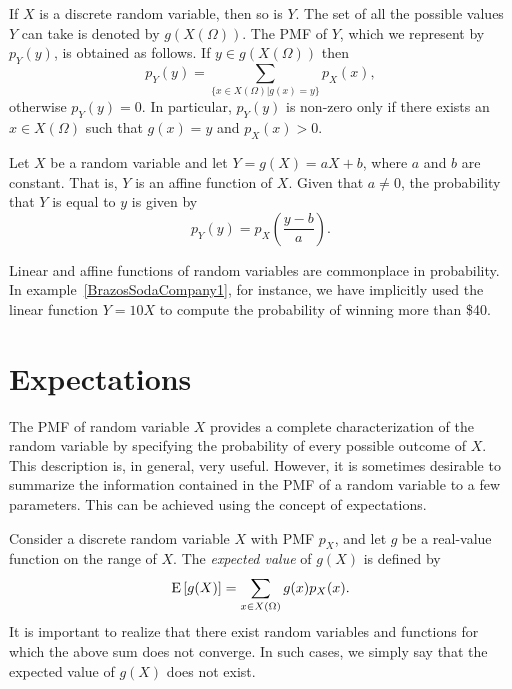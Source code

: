 If $X$ is a discrete random variable, then so is $Y$.
The set of all the possible values $Y$ can take is denoted by $g(X(\Omega))$.
The PMF of $Y$, which we represent by $p_Y (y)$, is obtained as follows.
If $y \in g(X(\Omega))$ then
\begin{equation} \label{equation:DefinitionFunctionPMF}
p_Y (y) = \sum_{ \{x \in X(\Omega) | g(x) = y \} } p_X (x) ,
\end{equation}
otherwise $p_Y (y) = 0$.
In particular, $p_Y (y)$ is non-zero only if there exists an $x \in X(\Omega)$ such that $g(x) = y$ and $p_X (x) > 0$.

\begin{example}
Let $X$ be a random variable and let $Y = g(X) = aX + b$, where $a$ and $b$ are constant.
That is, $Y$ is an affine function of $X$.
Given that $a \neq 0$, the probability that $Y$ is equal to $y$ is given by
\begin{equation*}
p_Y(y) = p_X \left( \frac{ y - b }{a} \right) .
\end{equation*}
\end{example}

Linear and affine functions of random variables are commonplace in probability.
In example~\ref{BrazosSodaCompany1}, for instance, we have implicitly used the linear function $Y = 10 X$ to compute the probability of winning more than \$40.


\section{Expectations}

The PMF of random variable $X$ provides a complete characterization of the  random variable by specifying the probability of every possible outcome of $X$.
This description is, in general, very useful.
However, it is sometimes desirable to summarize the information contained in the PMF of a random variable to a few parameters.
This can be achieved using the concept of expectations.

Consider a discrete random variable $X$ with PMF $p_X$, and let $g$ be a real-value function on the range of $X$.
The \emph{expected value} of $g(X)$ is defined by
\begin{equation} \label{equation:Expectation}
\mathrm{E} \left[ g(X) \right]
= \sum_{x \in X(\Omega)} g(x) p_X (x) .
\end{equation}
It is important to realize that there exist random variables and functions for which the above sum does not converge.
In such cases, we simply say that the expected value of $g(X)$ does not exist.

